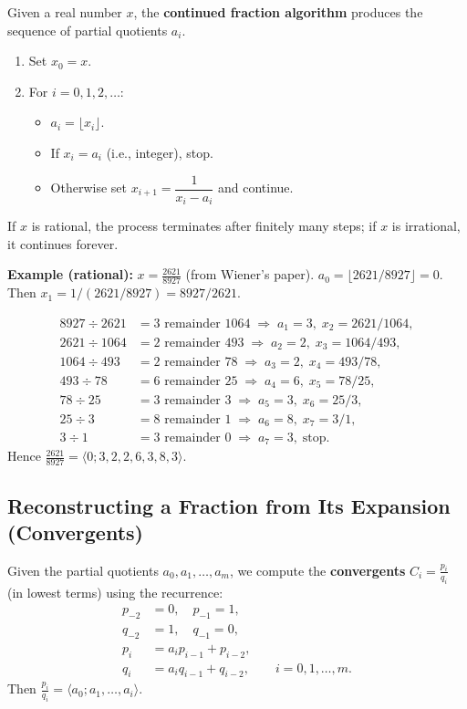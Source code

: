 Given a real number \(x\), the \textbf{continued fraction algorithm} produces the sequence of partial quotients \(a_i\).

\begin{enumerate}
\item Set \(x_0 = x\).
\item For \(i = 0,1,2,\dots\):
    \begin{itemize}
        \item \(a_i = \lfloor x_i \rfloor\).
        \item If \(x_i = a_i\) (i.e., integer), stop.
        \item Otherwise set \(x_{i+1} = \dfrac{1}{x_i - a_i}\) and continue.
    \end{itemize}
\end{enumerate}
If \(x\) is rational, the process terminates after finitely many steps; if \(x\) is irrational, it continues forever.

\textbf{Example (rational):} \(x = \frac{2621}{8927}\) (from Wiener's paper).  
\(a_0 = \lfloor 2621/8927 \rfloor = 0\). Then \(x_1 = 1/(2621/8927) = 8927/2621\).

\begin{align*}
8927 \div 2621 &= 3 \text{ remainder } 1064 \;\Rightarrow\; a_1=3,\; x_2 = 2621/1064,\\
2621 \div 1064 &= 2 \text{ remainder } 493 \;\Rightarrow\; a_2=2,\; x_3 = 1064/493,\\
1064 \div 493 &= 2 \text{ remainder } 78 \;\Rightarrow\; a_3=2,\; x_4 = 493/78,\\
493 \div 78 &= 6 \text{ remainder } 25 \;\Rightarrow\; a_4=6,\; x_5 = 78/25,\\
78 \div 25 &= 3 \text{ remainder } 3 \;\Rightarrow\; a_5=3,\; x_6 = 25/3,\\
25 \div 3 &= 8 \text{ remainder } 1 \;\Rightarrow\; a_6=8,\; x_7 = 3/1,\\
3 \div 1 &= 3 \text{ remainder } 0 \;\Rightarrow\; a_7=3,\; \text{stop}.
\end{align*}
Hence \(\frac{2621}{8927} = \langle 0;3,2,2,6,3,8,3\rangle\).

\subsection*{Reconstructing a Fraction from Its Expansion (Convergents)}

Given the partial quotients \(a_0, a_1, \dots, a_m\), we compute the \textbf{convergents} \(C_i = \frac{p_i}{q_i}\) (in lowest terms) using the recurrence:
\[
\begin{aligned}
p_{-2} &= 0,\quad p_{-1} = 1, \\
q_{-2} &= 1,\quad q_{-1} = 0, \\
p_i &= a_i p_{i-1} + p_{i-2}, \\
q_i &= a_i q_{i-1} + q_{i-2}, \qquad i = 0,1,\dots,m.
\end{aligned}
\]
Then \(\frac{p_i}{q_i} = \langle a_0; a_1, \dots, a_i \rangle\).

